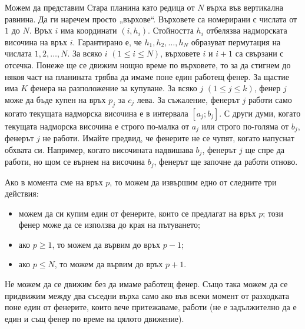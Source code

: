 \documentclass[12pt]{article}
\begin{document}
\renewcommand{\headerLang}{Български}
\renewcommand{\problemName}{?. PEAKS}

\renewcommand{\headerLeft}{
	IATI Day 1, Senior group\\
	\emoji{globe-with-meridians} \normalfont{\headerLang}
}
\renewcommand{\headerRight}{
	XVI INTERNATIONAL ADVANCED TOURNAMENT IN INFORMATICS\\
	SHUMEN 2025
}

\renewcommand{\tl}{$3$ сек.}
\renewcommand{\ml}{$256$ MB}
\problem{Задача \problemName}

Можем да представим Стара планина като редица от $N$ върха във вертикална равнина. Да ги наречем просто „върхове“. Върховете са номерирани с числата от $1$ до $N$. Връх $i$ има координати $(i, h_i)$. Стойността $h_i$ отбелязва надморската височина на връх $i$. Гарантирано е, че $h_1, h_2, \dots, h_ N$ образуват пермутация на числата $1, 2, \dots,  N$. За всяко $i$ $(1 \le i \le  N)$, върховете $i$ и $i+1$ са свързани с отсечка. Понеже ще се движим нощно време по върховете, то за да стигнем до някоя част на планината трябва да имаме поне един работещ фенер. За щастие има $K$ фенера на разположение за купуване. За всяко $j$ $(1 \le j \le k)$, фенер $j$ може да бъде купен на връх $p_j$ за $c_j$ лева. За съжаление, фенерът $j$ работи само когато текущата надморска височина е в интервала $[a_j; b_j]$. С други думи, когато текущата надморска височина е строго по-малка от $a_j$ или строго по-голяма от $b_j$, фенерът $j$ не работи. Имайте предвид, че фенерите не се чупят, когато напуснат обхвата си. Например, когато височината надвишава $b_j$, фенерът $j$ ще спре да работи, но щом се върнем на височина $b_j$, фенерът ще започне да работи отново.

Ако в момента сме на връх $p$, то можем да извършим едно от следните три действия:
\begin{itemize}
	\item можем да си купим един от фенерите, които се предлагат на връх $p$; този фенер може да се използва до края на пътуването;
	\item ако $p \ge 1$, то можем да вървим до връх $p-1$;
	\item ако $p \le  N$, то можем да вървим до връх $p+1$.
\end{itemize}
Не можем да се движим без да имаме работещ фенер. Също така можем да се придвижим между два съседни върха само ако във всеки момент от разходката поне един от фенерите, които вече притежаваме, работи (не е задължително да е един и същ фенер по време на цялото движение).
\end{document}
